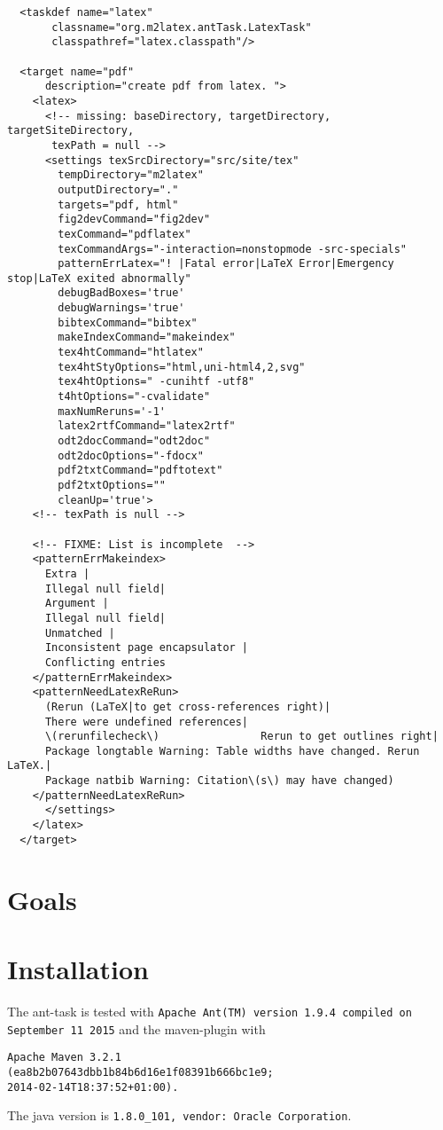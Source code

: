 \documentclass[12pt]{article}
\begin{document}
\begin{lstlisting}
  <taskdef name="latex"
	   classname="org.m2latex.antTask.LatexTask"
	   classpathref="latex.classpath"/>

  <target name="pdf"
	  description="create pdf from latex. ">
    <latex>
      <!-- missing: baseDirectory, targetDirectory, targetSiteDirectory,
	   texPath = null -->
      <settings texSrcDirectory="src/site/tex"
		tempDirectory="m2latex"
		outputDirectory="."
		targets="pdf, html"
		fig2devCommand="fig2dev"
		texCommand="pdflatex"
		texCommandArgs="-interaction=nonstopmode -src-specials"
		patternErrLatex="! |Fatal error|LaTeX Error|Emergency stop|LaTeX exited abnormally"
		debugBadBoxes='true'
		debugWarnings='true'
		bibtexCommand="bibtex"
		makeIndexCommand="makeindex"
		tex4htCommand="htlatex"
		tex4htStyOptions="html,uni-html4,2,svg"
		tex4htOptions=" -cunihtf -utf8"
		t4htOptions="-cvalidate"
		maxNumReruns='-1'
		latex2rtfCommand="latex2rtf"
		odt2docCommand="odt2doc"
		odt2docOptions="-fdocx"
		pdf2txtCommand="pdftotext"
		pdf2txtOptions=""
		cleanUp='true'>
	<!-- texPath is null -->
	
	<!-- FIXME: List is incomplete  -->
	<patternErrMakeindex>
	  Extra |
	  Illegal null field| 
	  Argument |
	  Illegal null field|
	  Unmatched |
	  Inconsistent page encapsulator |
	  Conflicting entries
	</patternErrMakeindex>
	<patternNeedLatexReRun>
	  (Rerun (LaTeX|to get cross-references right)|
	  There were undefined references|
	  \(rerunfilecheck\)                Rerun to get outlines right|
	  Package longtable Warning: Table widths have changed. Rerun LaTeX.|
	  Package natbib Warning: Citation\(s\) may have changed)
	</patternNeedLatexReRun>
      </settings>
    </latex>
  </target>
\end{lstlisting}


\section{Goals}



\section{Installation}

The ant-task is tested with 
{\tt Apache Ant(TM) version 1.9.4 compiled on September 11 2015}
and the maven-plugin with 
%
\begin{verbatim}
Apache Maven 3.2.1
(ea8b2b07643dbb1b84b6d16e1f08391b666bc1e9; 
2014-02-14T18:37:52+01:00). 
\end{verbatim}
The java version is {\tt 1.8.0\_101, vendor: Oracle Corporation}. 
\end{document}
